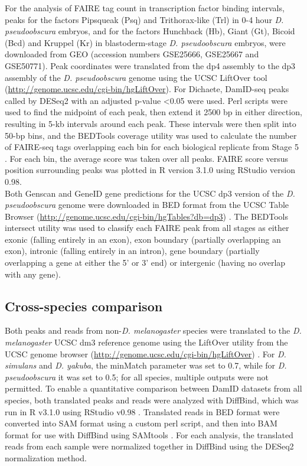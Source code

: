 For the analysis of FAIRE tag count in transcription factor binding intervals, peaks for the factors Pipsqueak (Psq) and Trithorax-like (Trl) in 0-4 hour \emph{D. pseudoobscura} embryos, and for the factors Hunchback (Hb), Giant (Gt), Bicoid (Bcd) and Kruppel (Kr) in blastoderm-stage \emph{D. pseudoobscura} embryos, were downloaded from GEO (accession numbers GSE25666, GSE25667 and GSE50771). Peak coordinates were translated from the dp4 assembly to the dp3 assembly of the \emph{D. pseudoobscura} genome using the UCSC LiftOver tool (\url{http://genome.ucsc.edu/cgi-bin/hgLiftOver}). For Dichaete, DamID-seq peaks called by DESeq2 with an adjusted p-value \textless 0.05 were used. Perl scripts were used to find the midpoint of each peak, then extend it 2500 bp in either direction, resulting in 5-kb intervals around each peak. These intervals were then split into 50-bp bins, and the BEDTools coverage utility was used to calculate the number of FAIRE-seq tags overlapping each bin for each biological replicate from Stage 5 \citep{quinlan_bedtools:_2010}. For each bin, the average score was taken over all peaks. FAIRE score versus position surrounding peaks was plotted in R version 3.1.0 using RStudio version 0.98.\\

Both Genscan and GeneID gene predictions for the UCSC dp3 version of the \emph{D. pseudoobscura} genome were downloaded in BED format from the UCSC Table Browser (\url{http://genome.ucsc.edu/cgi-bin/hgTables?db=dp3}) \citep{burge_prediction_1997,karolchik_ucsc_2004, karolchik_ucsc_2014,parra_geneid_2000}. The BEDTools intersect utility \citep{quinlan_bedtools:_2010} was used to classify each FAIRE peak from all stages as either exonic (falling entirely in an exon), exon boundary (partially overlapping an exon), intronic (falling entirely in an intron), gene boundary (partially overlapping a gene at either the 5' or 3' end) or intergenic (having no overlap with any gene).

\subsection{Cross-species comparison}
Both peaks and reads from non-\emph{D. melanogaster} species were translated to the \emph{D. melanogaster} UCSC dm3 reference genome using the LiftOver utility from the UCSC genome browser (\url{http://genome.ucsc.edu/cgi-bin/hgLiftOver}) \citep{bardet_computational_2011}. For \emph{D. simulans} and \emph{D. yakuba}, the minMatch parameter was set to 0.7, while for \emph{D. pseudoobscura} it was set to 0.5; for all species, multiple outputs were not permitted. To enable a quantitative comparison between DamID datasets from all species, both translated peaks and reads were analyzed with DiffBind, which was run in R v3.1.0 using RStudio v0.98 \citep{ross-innes_differential_2012}. Translated reads in BED format were converted into SAM format using a custom perl script, and then into BAM format for use with DiffBind using SAMtools \citep{li_sequence_2009}. For each analysis, the translated reads from each sample were normalized together in DiffBind using the DESeq2 normalization method. 

